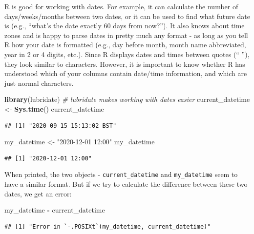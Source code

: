 \documentclass[
  12pt,
  krantz2]{krantz}
\makeatletter
\newenvironment{Shaded}{\begin{snugshade}}{\end{snugshade}}
\newcommand{\CommentTok}[1]{\textcolor[rgb]{0.56,0.35,0.01}{\textit{#1}}}
\newcommand{\KeywordTok}[1]{\textcolor[rgb]{0.13,0.29,0.53}{\textbf{#1}}}
\newcommand{\NormalTok}[1]{#1}
\newcommand{\OperatorTok}[1]{\textcolor[rgb]{0.81,0.36,0.00}{\textbf{#1}}}
\newcommand{\StringTok}[1]{\textcolor[rgb]{0.31,0.60,0.02}{#1}}
\newenvironment{kframe}{%
\medskip{}
\setlength{\fboxsep}{.8em}
 \def\at@end@of@kframe{}%
 \ifinner\ifhmode%
  \def\at@end@of@kframe{\end{minipage}}%
  \begin{minipage}{\columnwidth}%
 \fi\fi%
 \def\FrameCommand##1{\hskip\@totalleftmargin \hskip-\fboxsep
 \colorbox{shadecolor}{##1}\hskip-\fboxsep
     \hskip-\linewidth \hskip-\@totalleftmargin \hskip\columnwidth}%
 \MakeFramed {\advance\hsize-\width
   \@totalleftmargin\z@ \linewidth\hsize
   \@setminipage}}%
 {\par\unskip\endMakeFramed%
 \at@end@of@kframe}
\renewenvironment{Shaded}{\begin{kframe}}{\end{kframe}}
\makeatother
\begin{document}
R is good for working with dates.
For example, it can calculate the number of days/weeks/months between two dates, or it can be used to find what future date is (e.g., ``what's the date exactly 60 days from now?'').
It also knows about time zones and is happy to parse dates in pretty much any format - as long as you tell R how your date is formatted (e.g., day before month, month name abbreviated, year in 2 or 4 digits, etc.).
Since R displays dates and times between quotes (`` ''), they look similar to characters.
However, it is important to know whether R has understood which of your columns contain date/time information, and which are just normal characters.

\begin{Shaded}
\begin{Highlighting}[]
\KeywordTok{library}\NormalTok{(lubridate) }\CommentTok{# lubridate makes working with dates easier}
\NormalTok{current_datetime <-}\StringTok{ }\KeywordTok{Sys.time}\NormalTok{()}
\NormalTok{current_datetime}
\end{Highlighting}
\end{Shaded}

\begin{verbatim}
## [1] "2020-09-15 15:13:02 BST"
\end{verbatim}

\begin{Shaded}
\begin{Highlighting}[]
\NormalTok{my_datetime <-}\StringTok{ "2020-12-01 12:00"}
\NormalTok{my_datetime}
\end{Highlighting}
\end{Shaded}

\begin{verbatim}
## [1] "2020-12-01 12:00"
\end{verbatim}

When printed, the two objects - \texttt{current\_datetime} and \texttt{my\_datetime} seem to have a similar format.
But if we try to calculate the difference between these two dates, we get an error:

\begin{Shaded}
\begin{Highlighting}[]
\NormalTok{my_datetime }\OperatorTok{-}\StringTok{ }\NormalTok{current_datetime}
\end{Highlighting}
\end{Shaded}

\begin{verbatim}
## [1] "Error in `-.POSIXt`(my_datetime, current_datetime)"
\end{verbatim}
\end{document}
